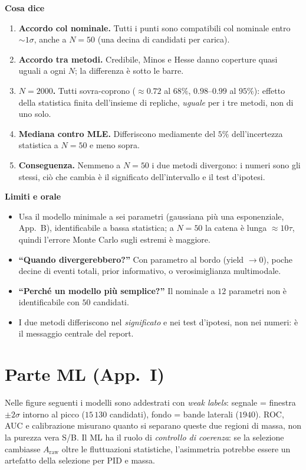 \documentclass[10.5pt,a4paper]{article}
\newcommand{\Araw}{A_{\mathrm{raw}}}
\newcommand{\sez}[1]{\par\Needspace{6\baselineskip}\medskip\noindent\textbf{\large #1}\par\nopagebreak\smallskip}
\begin{document}
\sez{Cosa dice}
\begin{enumerate}
\item \textbf{Accordo col nominale.} Tutti i punti sono compatibili col nominale entro $\sim1\sigma$, anche a $N=50$ (una decina di candidati per carica).
\item \textbf{Accordo tra metodi.} Credibile, Minos e Hesse danno coperture quasi uguali a ogni $N$; la differenza è sotto le barre.
\item \textbf{$N=2000$.} Tutti sovra-coprono ($\approx0.72$ al $68\%$, $0.98$--$0.99$ al $95\%$): effetto della statistica finita dell'insieme di repliche, \emph{uguale} per i tre metodi, non di uno solo.
\item \textbf{Mediana contro MLE.} Differiscono mediamente del $5\%$ dell'incertezza statistica a $N=50$ e meno sopra.
\item \textbf{Conseguenza.} Nemmeno a $N=50$ i due metodi divergono: i numeri sono gli stessi, ciò che cambia è il significato dell'intervallo e il test d'ipotesi.
\end{enumerate}

\sez{Limiti e orale}
\begin{itemize}
\item Usa il modello minimale a sei parametri (gaussiana più una esponenziale, App.~B), identificabile a bassa statistica; a $N=50$ la catena è lunga $\approx10\tau$, quindi l'errore Monte Carlo sugli estremi è maggiore.
\item \textbf{``Quando divergerebbero?''} Con parametro al bordo (yield $\to0$), poche decine di eventi totali, prior informativo, o verosimiglianza multimodale.
\item \textbf{``Perché un modello più semplice?''} Il nominale a $12$ parametri non è identificabile con $50$ candidati.
\item I due metodi differiscono nel \emph{significato} e nei test d'ipotesi, non nei numeri: è il messaggio centrale del report.
\end{itemize}

\clearpage
\section*{Parte ML (App.\ I)}
Nelle figure seguenti i modelli sono addestrati con \emph{weak labels}: segnale = finestra $\pm2\sigma$ intorno al picco ($15\,130$ candidati), fondo = bande laterali ($1940$). ROC, AUC e calibrazione misurano quanto si separano queste due regioni di massa, non la purezza vera S/B. Il ML ha il ruolo di \emph{controllo di coerenza}: se la selezione cambiasse $\Araw$ oltre le fluttuazioni statistiche, l'asimmetria potrebbe essere un artefatto della selezione per PID e massa.
\end{document}
